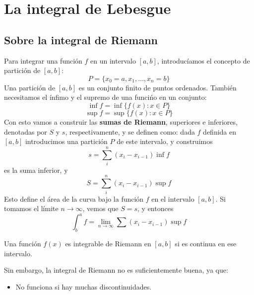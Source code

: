 \documentclass{./Calculo.tex}
\begin{document}
\chapter{La integral de Lebesgue}
\section{Sobre la integral de Riemann}
Para integrar una función $f$ en un intervalo $[a,b]$, introducíamos el concepto de partición de $[a,b]$:
\[
	P = \{ x_0=a,x_1,\dots ,x_{n} = b \}
\]
Una partición de $[a,b]$ es un conjunto finito de puntos ordenados. También necesitamos el ínfimo y el supremo de una funcińo en un conjunto:
\[
	\inf f = \inf \{ f(x) : x \in P \}
\]
\[
	\sup f = \sup \{ f(x) : x \in P \}
\]
Con esto vamos a construir las \textbf{sumas de Riemann}, superiores e inferiores, denotadas por $S$ y $s$, respectivamente, y se definen como:
dada $f$ definida en $[a,b]$  introducimos una partición $P$ de este intervalo, y construimos
\[
	s = \sum_{i}^{n} (x_{i} - x_{i-1}) \inf f
\]
es la suma inferior, y
\[
	S = \sum_{i}^{n} (x_{i}-x_{i-1}) \sup f
\]
Esto define el área de la curva bajo la función $f$ en el intervalo $[a,b]$. Si tomamos el límite $n \to \infty$, vemos que $S = s$, y entonces
\[
	\int_{b}^{a} f = \lim_{n \to \infty} \sum (x_{i}-x_{i-1}) \sup f
\]
\begin{teorema}
	Una función $f(x)$ es integrable de Riemann en $[a,b]$ si es continua en ese intervalo.  
\end{teorema}
Sin embargo, la integral de Riemann no es suficientemente buena, ya que:
\begin{itemize}
	\item No funciona si hay muchas discontinuidades.
\end{itemize}
\end{document}
